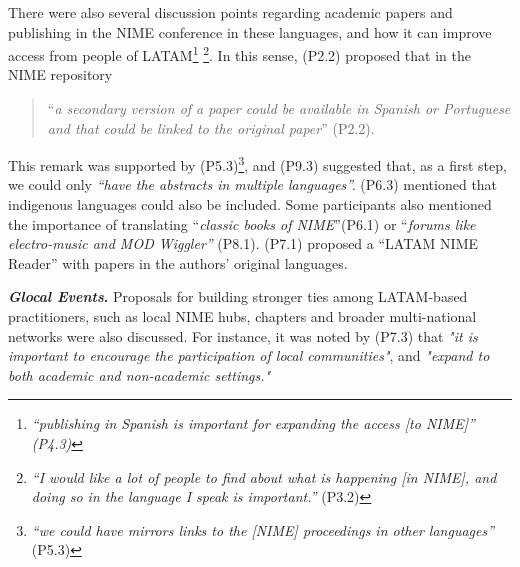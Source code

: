 \documentclass[sigconf]{nimeart}
\begin{document}
There were also several discussion points regarding academic papers and publishing in the NIME conference in these languages, and how it can improve access from people of LATAM\footnote{\emph{``publishing in Spanish is important for expanding the access {[}to NIME{]}'' (P4.3)}} \footnote{\emph{``I would like a lot of people to find about what is happening {[}in NIME{]}, and doing so in the language I speak is important.''} (P3.2)}. In this sense, (P2.2) proposed that in the NIME repository

\begin{quote}
``\emph{a secondary version of a paper could be available in Spanish or Portuguese and that could be linked to the original paper}'' (P2.2).
\end{quote}

This remark was supported by (P5.3)\footnote{\emph{``we could have mirrors links to the {[}NIME{]} proceedings in other languages''} (P5.3)}, and (P9.3) suggested that, as a first step, we could only \emph{``have the abstracts in multiple languages''.} (P6.3) mentioned that indigenous languages could also be included. Some participants also mentioned the importance of translating ``\emph{classic books of NIME}''(P6.1) or ``\emph{forums like electro-music and MOD Wiggler''} (P8.1). (P7.1) proposed a ``LATAM NIME Reader''\cite{jensenius2017nime} with papers in the authors' original languages.

\textbf{\emph{Glocal Events}.} Proposals for building stronger ties among LATAM-based practitioners, such as local NIME hubs, chapters and broader multi-national networks were also discussed. \textbf{} For instance, it was noted by (P7.3) that \emph{"it is important to encourage the participation of local communities"}, and \emph{"expand to both academic and non-academic settings."}
\end{document}
